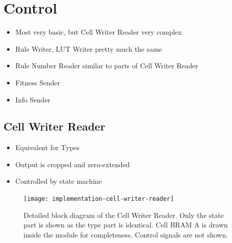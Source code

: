 




\section{Control}

\begin{itemize}
    \item Most very basic, but Cell Writer Reader very complex
    \item Rule Writer, LUT Writer pretty much the same
    \item Rule Number Reader similar to parts of Cell Writer Reader
    \item Fitness Sender
    \item Info Sender
\end{itemize}

\subsection{Cell Writer Reader}

\begin{itemize}
    \item Equivalent for Types
    \item Output is cropped and zero-extended
    \item Controlled by state machine
\end{itemize}

\begin{figure}[!ht]
    \centering
    \texttt{[image: implementation-cell-writer-reader]}
    \caption[Cell Writer Reader]{
        Detailed block diagram of the Cell Writer Reader.
        Only the state part is shown as the type part is identical.
        Cell BRAM A is drawn inside the module for completeness.
        Control signals are not shown.
    }
    \label{fig:implementation-cell-writer-reader}
\end{figure}


